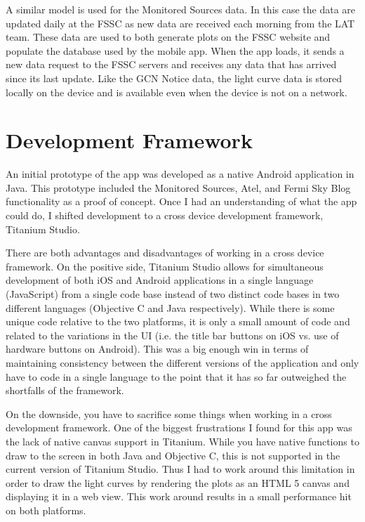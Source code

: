 A similar model is used for the Monitored Sources data.  In this case the data are updated daily at the FSSC as new data are received each morning from the LAT team.  These data are used to both generate plots on the FSSC website and populate the database used by the mobile app.  When the app loads, it sends a new data request to the FSSC servers and receives any data that has arrived since its last update.  Like the GCN Notice data, the light curve data is stored locally on the device and is available even when the device is not on a network.

\section{Development Framework}
An initial prototype of the app was developed as a native Android application in Java.  This prototype included the Monitored Sources, Atel, and Fermi Sky Blog functionality as a proof of concept.  Once I had an understanding of what the app could do, I shifted development to a cross device development framework, Titanium Studio.  

There are both advantages and disadvantages of working in a cross device framework.  On the positive side, Titanium Studio allows for simultaneous development of both iOS and Android applications in a single language (JavaScript) from a single code base instead of two distinct code bases in two different languages (Objective C and Java respectively).  While there is some unique code relative to the two platforms, it is only a small amount of code and related to the variations in the UI (i.e. the title bar buttons on iOS vs. use of hardware buttons on Android).  This was a big enough win in terms of maintaining consistency between the different versions of the application and only have to code in a single language to the point that it has so far outweighed the shortfalls of the framework.

On the downside, you have to sacrifice some things when working in a cross development framework.  One of the biggest frustrations I found for this app was the lack of native canvas support in Titanium.  While you have native functions to draw to the screen in both Java and Objective C, this is not supported in the current version of Titanium Studio.  Thus I had to work around this limitation in order to draw the light curves by rendering the plots as an HTML 5 canvas and displaying it in a web view.  This work around results in a small performance hit on both platforms.

